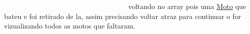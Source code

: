 ~\newline
~\newline
~\newline
~\newline
~\newline
~\newline
~\newline
~\newline
~\newline
~\newline
~\newline
~\newline
~\newline
~\newline
~\newline
~\newline
~\newline
~\newline
~\newline
~\newline
~\newline
 voltando no array pois uma \mbox{\hyperlink{class_moto}{Moto}} que bateu e foi retirado de la, assim precisando voltar atraz para continuar o for vizualizando todos as motos que faltaram. ~\newline
~\newline
~\newline
~\newline
~\newline
~\newline
~\newline
~\newline
~\newline
~\newline
~\newline
~\newline
~\newline
~\newline
~\newline
~\newline
~\newline
~\newline
~\newline
~\newline
~\newline
~\newline
~\newline
~\newline
~\newline
~\newline
~\newline
~\newline
